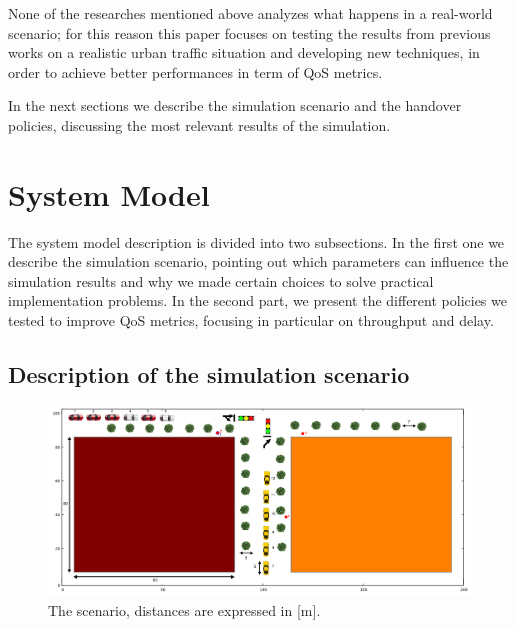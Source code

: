 \documentclass[conference,10pt]{IEEEtran}
\begin{document}
None of the researches mentioned above analyzes what happens in a real-world scenario; for this reason this paper focuses on testing the results from previous works on a realistic urban traffic situation and developing new techniques, in order to achieve better performances in term of QoS metrics.

In the next sections we describe the simulation scenario and the handover policies, discussing the most relevant results of the simulation.


\section{System Model}\label{sec:symo}
The system model description is divided into two subsections. In the first one we describe the simulation scenario, pointing out which parameters can influence the simulation results and why we made certain choices to solve practical implementation problems.
In the second part, we present the different policies we tested to improve QoS metrics, focusing in particular on throughput and delay.

\subsection{Description of the simulation scenario}

\begin{figure}[ht]
	\begin{center}    
		\includegraphics[width=14cm, keepaspectratio]{images/scenario3.png}
		\caption{The scenario, distances are expressed in [m].}
		\label{fig:scenario}
	\end{center}
\end{figure}
\end{document}
